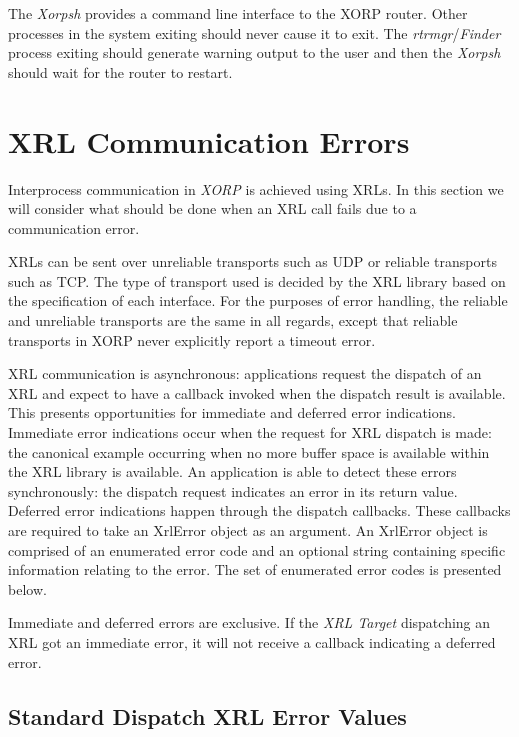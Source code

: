 \documentclass[11pt]{article}
\makeatletter
\newcommand{\xorp} {{\em XORP}\@\xspace}
\newcommand{\finder} {{\em Finder}\@\xspace}
\newcommand{\xorpsh} {{\em Xorpsh}\@\xspace}
\newcommand{\xt} {{\em XRL Target}\@\xspace}
\newcommand{\rtrmgr} {{\em rtrmgr}\@\xspace}
\makeatother
\begin{document}
The \xorpsh provides a command line interface to the XORP router.
Other processes in the system exiting should never cause it to
exit. The \rtrmgr/\finder process exiting should generate
warning output to the user and then the \xorpsh should wait for the
router to restart.

\section{XRL Communication Errors}

Interprocess communication in \xorp is achieved using XRLs. In this
section we will consider what should be done when an XRL call fails
due to a communication error.

XRLs can be sent over unreliable transports such as UDP or reliable
transports such as TCP. The type of transport used is decided by the
XRL library based on the specification of each interface.  For the
purposes of error handling, the reliable and unreliable transports are
the same in all regards, except that reliable transports in XORP never
explicitly report a timeout error.

XRL communication is asynchronous: applications request the dispatch
of an XRL and expect to have a callback invoked when the dispatch
result is available.  This presents opportunities for immediate and
deferred error indications.  Immediate error indications occur when
the request for XRL dispatch is made: the canonical example occurring
when no more buffer space is available within the XRL library is
available. An application is able to detect these errors
synchronously: the dispatch request indicates an error in its return
value.  Deferred error indications happen through the dispatch
callbacks.  These callbacks are required to take an XrlError object as
an argument.  An XrlError object is comprised of an enumerated error
code and an optional string containing specific information relating
to the error.  The set of enumerated error codes is presented below.

Immediate and deferred errors are exclusive.  If the \xt dispatching
an XRL got an immediate error, it will not receive a callback
indicating a deferred error.

\subsection*{Standard Dispatch XRL Error Values}
\end{document}
